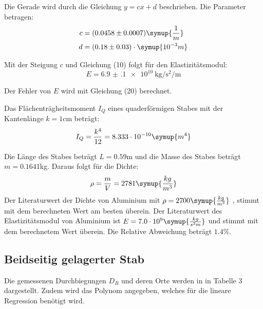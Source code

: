 Die Gerade wird durch die Gleichung $y = cx + d$ beschrieben. Die Parameter betragen:
\begin{align*}
  c &= (0.0458 \pm 0.0007) \symup{\frac{1}{m}} \\
  d &= (0.18  \pm 0.03)   \cdot \symup{10^{-3}m}
\end{align*}


Mit der Steigung $c$ und Gleichung (10) folgt für den Elastizitätsmodul:
\begin{equation}
  E = \SI{6.9(1)e10}{\kilo\gram\per\second\squared\per\meter}
\end{equation}

Der Fehler von $E$ wird mit Gleichung (20) berechnet.

Das Flächenträgheitsmoment $I_Q$ eines quaderförmigen Stabes mit der Kantenlänge
$k = 1$cm beträgt:
\begin{equation}
  I_Q = \frac{k^4}{12} = 8.333 \cdot 10^{-10} \symup{m^4}
\end{equation}


Die Länge des Stabes beträgt $L = 0.59$m und die Masse des Stabes beträgt $m = 0.1641$kg.
Daraus folgt für die Dichte:
\begin{equation}
  \rho = \frac{m}{V} = 2781 \symup{\frac{kg}{m^3}}
\end{equation}
Der Literaturwert der Dichte von Aluminium mit $\rho = 2700 \symup{\frac{kg}{m^3}}$ \cite{sample4},
stimmt mit dem berechneten Wert am besten überein. Der Literaturwert des Elastizitätsmodul
von Aluminium ist $E = 7.0 \cdot 10^{9} \symup{\frac{kg}{s^2m}}$ \cite{sample3} und stimmt mit dem berechnetem Wert
überein. Die Relative Abweichung beträgt $1.4 \%$.

\subsection{Beidseitig gelagerter Stab}
Die gemessenen Durchbiegungen $D_{B}$ und deren Orte werden in in Tabelle 3 dargestellt. Zudem wird
das Polynom angegeben, welches für die lineare Regression benötigt wird.

